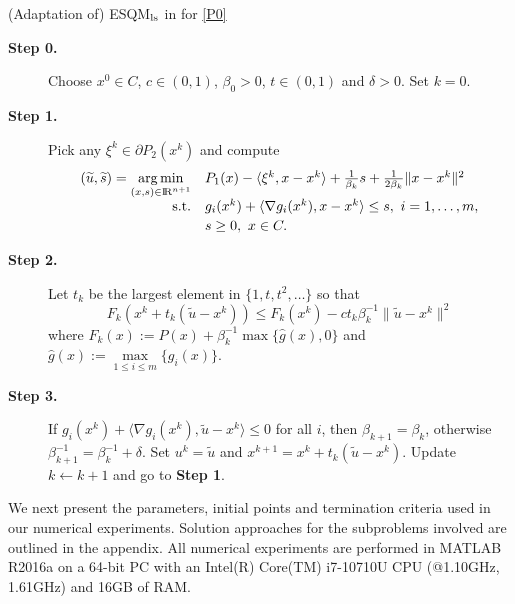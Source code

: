 \documentclass[10pt]{article}
\numberwithin{equation}{section}
\def\R{{\rm I\!R}}
\def\argmin{\mathop{\rm arg\,min}}
\begin{document}
\begin{algorithm}
\caption{(Adaptation of) ESQM$_{\rm ls}$ in \cite{Au13} for \eqref{P0}}\label{ESQM}
\begin{algorithmic}
\STATE
\begin{description}
  \item[\bf Step 0.] Choose $x^0\in C$, $c \in (0, 1)$, $\beta_0 > 0$, $t\in(0, 1)$ and $\delta > 0$. Set $k = 0$.
  \item[\bf Step 1.] Pick any $\xi^k\in\partial P_2(x^k)$ and compute
  \begin{equation}\label{subproblemhaha}
  \begin{array}{rl}
  (\widetilde u,\widetilde s) = \argmin\limits_{(x,s)\in\R^{n+1}} & P_1(x) -\langle \xi^k, x - x^k\rangle + \frac{1}{\beta_k} s + \frac{1}{2\beta_k}\|x - x^k\|^2\\ [2pt]
      {\rm s.t.}& g_i(x^k) + \langle \nabla g_i(x^k), x - x^k\rangle \leq s,\ i = 1, \ldots, m,\\ [2pt]
      & s \geq 0,\ x\in C.
  \end{array}
  \end{equation}

  \item[\bf Step 2.] Let $t_k$ be the largest element in $\{1, t, t^2, \ldots\}$ so that
  \begin{equation*}
    F_k(x^k + t_k (\widetilde{u} - x^k)) \le F_k(x^k) - c t_k \beta_k^{-1} \|\widetilde{u} - x^k\|^2
  \end{equation*}
  where $F_k(x):= P(x) + \beta^{-1}_k \max\{\widehat g(x),0\}$ and $\widehat g(x) := \max\limits_{1\le i\le m}\{g_i(x)\}$.

  \item[\bf Step 3.] If $g_i(x^k) + \langle \nabla g_i(x^k), \widetilde{u} - x^k\rangle \leq 0$ for all $i$, then $\beta_{k+1} = \beta_k$, otherwise $\beta_{k+1}^{-1} = \beta_k^{-1} + \delta$. Set $u^k = \widetilde u$ and $x^{k+1} = x^k + t_k (\widetilde{u} - x^k)$. Update $k \leftarrow k+1$ and go to \textbf{Step 1}.
\end{description}
\end{algorithmic}
\end{algorithm}

We next present the parameters, initial points and termination criteria used in our numerical experiments. Solution approaches for the subproblems involved are outlined in the appendix. All numerical experiments are performed in {\color{blue} MATLAB R2016a on a 64-bit PC with an Intel(R) Core(TM) i7-10710U CPU (@1.10GHz, 1.61GHz) and 16GB of RAM.}
\end{document}
